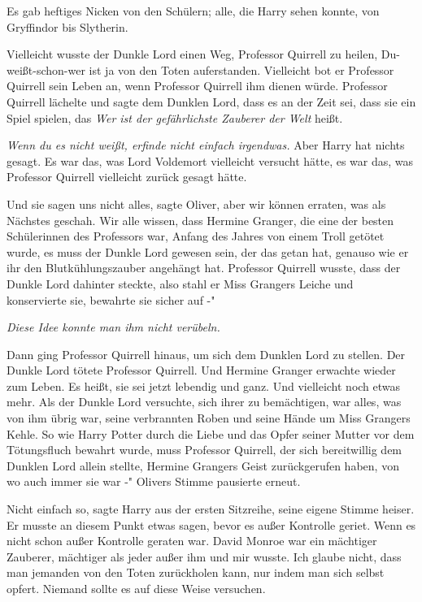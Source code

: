 Es gab heftiges Nicken von den Schülern; alle, die Harry sehen konnte, von
Gryffindor bis Slytherin.

\glqq Vielleicht wusste der Dunkle Lord einen Weg, Professor Quirrell zu heilen,
Du-weißt-schon-wer ist ja von den Toten auferstanden. Vielleicht bot er
Professor Quirrell sein Leben an, wenn Professor Quirrell ihm dienen würde.
Professor Quirrell lächelte und sagte dem Dunklen Lord, dass es an der Zeit sei,
dass sie ein Spiel spielen, das \emph{\glqq Wer ist der gefährlichste Zauberer
der Welt\grqq{} } heißt.\emph{\glqq }

\emph{Wenn du es nicht weißt, erfinde nicht einfach irgendwas. }
Aber Harry hat nichts gesagt. Es war das, was Lord Voldemort vielleicht versucht
hätte, es war das, was Professor Quirrell vielleicht zurück gesagt hätte.

\glqq Und sie sagen uns nicht alles\grqq{}, sagte Oliver, \glqq aber wir können
erraten, was als Nächstes geschah. Wir alle wissen, dass Hermine Granger, die
eine der besten Schülerinnen des Professors war, Anfang des Jahres von einem
Troll getötet wurde, es muss der Dunkle Lord gewesen sein, der das getan hat,
genauso wie er ihr den Blutkühlungszauber angehängt hat. Professor Quirrell
wusste, dass der Dunkle Lord dahinter steckte, also stahl er Miss Grangers
Leiche und konservierte sie, bewahrte sie sicher auf -"

\emph{Diese Idee konnte man ihm nicht verübeln.}

\glqq Dann ging Professor Quirrell hinaus, um sich dem Dunklen Lord zu stellen.
Der Dunkle Lord tötete Professor Quirrell. Und Hermine Granger erwachte wieder
zum Leben. Es heißt, sie sei jetzt lebendig und ganz. Und vielleicht noch etwas
mehr. Als der Dunkle Lord versuchte, sich ihrer zu bemächtigen, war alles, was
von ihm übrig war, seine verbrannten Roben und seine Hände um Miss Grangers
Kehle. So wie Harry Potter durch die Liebe und das Opfer seiner Mutter vor dem
Tötungsfluch bewahrt wurde, muss Professor Quirrell, der sich bereitwillig dem
Dunklen Lord allein stellte, Hermine Grangers Geist zurückgerufen haben, von wo
auch immer sie war -" Olivers Stimme pausierte erneut.

\glqq Nicht einfach so\grqq{}, sagte Harry aus der ersten Sitzreihe, seine
eigene Stimme heiser. Er musste an diesem Punkt etwas sagen, bevor es außer
Kontrolle geriet. Wenn es nicht schon außer Kontrolle geraten war. \glqq David
Monroe war ein mächtiger Zauberer, mächtiger als jeder außer ihm und mir wusste.
Ich glaube nicht, dass man jemanden von den Toten zurückholen kann, nur indem
man sich selbst opfert. Niemand sollte es auf diese Weise versuchen.\grqq{}

